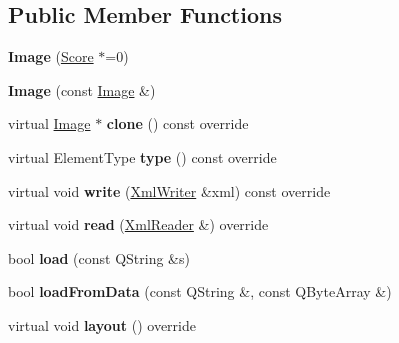 \subsection*{Public Member Functions}
\begin{DoxyCompactItemize}
\item 
\mbox{\label{class_ms_1_1_image_a7ad2bd494bd5732fd9195d245232743a}} 
{\bfseries Image} (\hyperlink{class_ms_1_1_score}{Score} $\ast$=0)
\item 
\mbox{\label{class_ms_1_1_image_ad887b7959259f2496f634e6cffb194c1}} 
{\bfseries Image} (const \hyperlink{class_ms_1_1_image}{Image} \&)
\item 
\mbox{\label{class_ms_1_1_image_afce26a2ea05ab33acac0d41badd49492}} 
virtual \hyperlink{class_ms_1_1_image}{Image} $\ast$ {\bfseries clone} () const override
\item 
\mbox{\label{class_ms_1_1_image_a305ebdd4a2d629cb2a1f4a07b53b5664}} 
virtual Element\+Type {\bfseries type} () const override
\item 
\mbox{\label{class_ms_1_1_image_a8282f61848c1e719a54dd75a7d48865b}} 
virtual void {\bfseries write} (\hyperlink{class_ms_1_1_xml_writer}{Xml\+Writer} \&xml) const override
\item 
\mbox{\label{class_ms_1_1_image_a17fd8d71fb2f87c53c555c139ff42294}} 
virtual void {\bfseries read} (\hyperlink{class_ms_1_1_xml_reader}{Xml\+Reader} \&) override
\item 
\mbox{\label{class_ms_1_1_image_aa327ab66a57a3e3e0f9ee1f69278f2a8}} 
bool {\bfseries load} (const Q\+String \&s)
\item 
\mbox{\label{class_ms_1_1_image_a8a9a55d8f79341f9da5c709811e3d7cc}} 
bool {\bfseries load\+From\+Data} (const Q\+String \&, const Q\+Byte\+Array \&)
\item 
\mbox{\label{class_ms_1_1_image_ac69d7c84dc146b8f4fbb80630caab45a}} 
virtual void {\bfseries layout} () override
\item 
\mbox{\label{class_ms_1_1_image_aa3da42538aa96747fcdf9db1a08a3ef8}} 

\end{DoxyCompactItemize}
